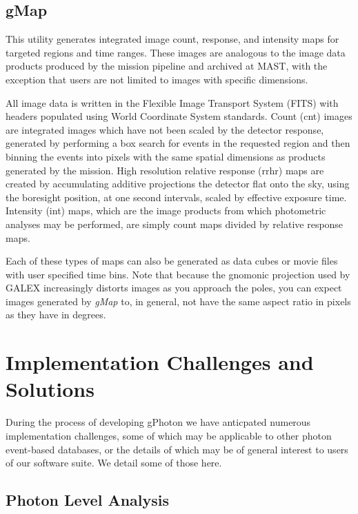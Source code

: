 \documentclass[preprint]{aastex}
\begin{document}
\subsection{gMap}
This utility generates integrated image count, response, and intensity maps for targeted regions and time ranges. These images are analogous to the image data products produced by the mission pipeline and archived at MAST, with the exception that users are not limited to images with specific dimensions.

All image data is written in the Flexible Image Transport System (FITS) with headers populated using World Coordinate System standards. Count (cnt) images are integrated images which have not been scaled by the detector response, generated by performing a box search for events in the requested region and then binning the events into pixels with the same spatial dimensions as products generated by the mission. High resolution relative response (rrhr) maps are created by accumulating additive projections the detector flat onto the sky, using the boresight position, at one second intervals, scaled by effective exposure time. Intensity (int) maps, which are the image products from which photometric analyses may be performed, are simply count maps divided by relative response maps.

Each of these types of maps can also be generated as data cubes or movie files with user specified time bins. Note that because the gnomonic projection used by GALEX increasingly distorts images as you approach the poles, you can expect images generated by \textit{gMap} to, in general, not have the same aspect ratio in pixels as they have in degrees.

\section{Implementation Challenges and Solutions}
\label{implementation}
During the process of developing gPhoton we have anticpated numerous implementation challenges, some of which may be applicable to other photon event-based databases, or the details of which may be of general interest to users of our software suite.  We detail some of those here.

\subsection{Photon Level Analysis}
\end{document}
